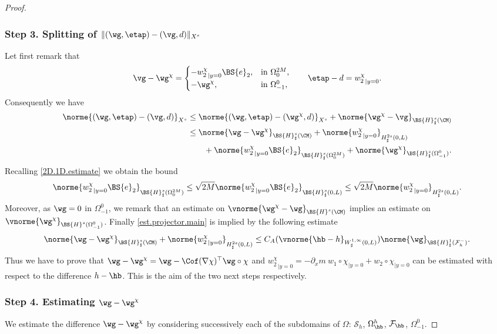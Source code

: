 \begin{proof}
\subsubsection*{Step 3. Splitting of $\|(\wg,\etap) - (\vg,d)\|_{X^s}$}
Let first remark that
\[\vg - \wg^\chi =\begin{cases}
-{w_{2}^\chi}_{|{y=0}}\BS{e}_{2},&\text{in } \Omega^{2M}_{0},\\
-\wg^\chi, & \text{in }\Omega^{0}_{-1},
\end{cases}
\qquad
\etap -d ={w_{2}^\chi}_{|{y=0}}.
\]
Consequently we have
\[
\begin{aligned}
\norme{(\wg,\etap) - (\vg,d)}_{X^s}&\leq \norme{(\wg,\etap) - (\wg^\chi,d)}_{X^s} +\norme{\wg^\chi - \vg}_{\BS{H}^{s}_{\sharp}(\CM)}\\
&\leq \norme{\wg -\wg^\chi}_{\BS{H}^{s}_{\sharp}(\CM)} + \norme{{w_{2}^\chi}_{|{y=0}}}_{H^{2s}_{\sharp}(0,L)} \\
& \qquad + \norme{{w_{2}^\chi}_{|{y=0}}\BS{e}_{2}}_{\BS{H}^{s}_{\sharp}(\Omega^{2M}_{0})}+\norme{\wg^\chi}_{\BS{H}^{s}_{\sharp}(\Omega_{-1}^{0})}.
\end{aligned}
\]
Recalling \eqref{2D.1D.estimate} we obtain the bound
\[\norme{{w_{2}^\chi}_{|{y=0}}\BS{e}_{2}}_{\BS{H}_\sharp^{s}(\Omega_{0}^{2M})}\leq \sqrt{2M}\norme{{w_{2}^\chi}_{|{y=0}}\BS{e}_{2}}_{\BS{H}_\sharp^{s}(0,L)}\leq \sqrt{2M}\norme{{w_{2}^\chi}_{|{y=0}}}_{H_\sharp^{2s}(0,L)}.\]
Moreover, as $\wg=0$ in $\Omega^{0}_{-1}$, we remark that an estimate on $\vnorme{\wg^\chi - \wg}_{\BS{H}^{s}(\CM)}$ implies an estimate on $\vnorme{\wg^\chi}_{\BS{H}^{s}(\Omega_{-1}^{0})}$. Finally \eqref{est.projector.main} is implied by the following estimate
\begin{equation}\label{est.projector.final}
\norme{\wg -\wg^\chi}_{\BS{H}^{s}_{\sharp}(\CM)}+ \norme{{w_{2}^\chi}_{|{y=0}}}_{H^{2s}_{\sharp}(0,L)}
\leq C_{A}(\vnorme{\hb -h }_{W^{1,\infty}_{\sharp}(0,L)})\norme{\wg}_{\BS{H}^{1}_{\sharp}(\mathcal{F}^{-}_{h})}.
\end{equation}
Thus we have to prove that $\wg -\wg^\chi=\wg-\Cof(\nabla \chi)^{\top}\wg\circ \chi $ and ${w_{2}^\chi}_{|{y=0}}=-\partial_x m \ w_{1}\circ\chi_{|{y=0}}+w_{2}\circ\chi_{|{y=0}}$ can be estimated with respect to the difference $h-\hb$. This is the aim of the two next steps respectively.

\subsubsection*{Step 4. Estimating $\wg -\wg^\chi$}
We estimate the difference $\wg - \wg^{\chi}$
by considering successively each of the subdomains of $\Omega$: $\mathcal{S}_{h}$, $\Omega_{\hb}^{h}$, $\mathcal{F}_{\hb}$, $\Omega_{-1}^{0}$.


\end{proof}
